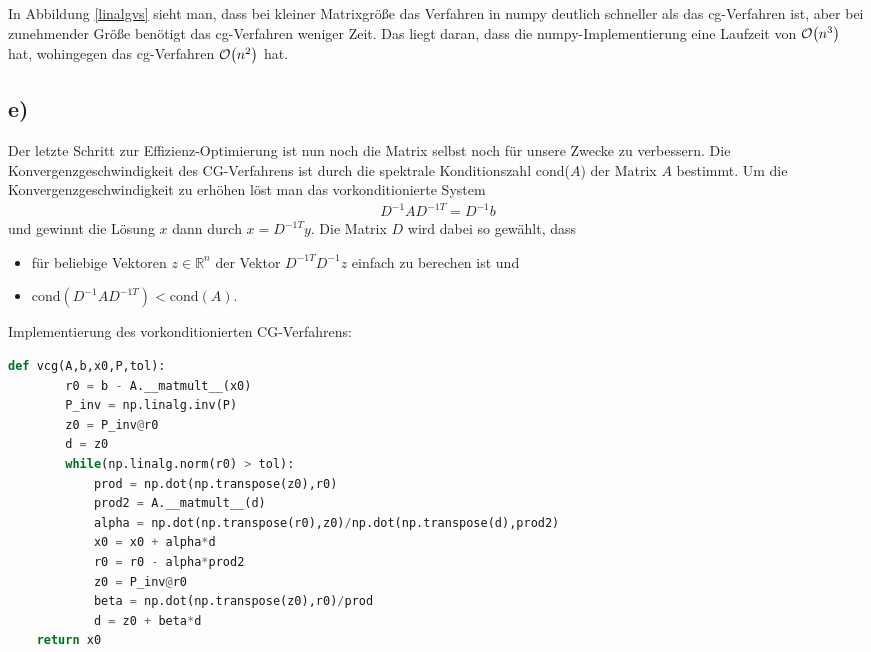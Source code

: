 In Abbildung \ref{linalgvs}  sieht man, dass bei kleiner Matrixgröße das Verfahren in numpy deutlich schneller als das cg-Verfahren ist, aber bei zunehmender Größe benötigt das cg-Verfahren weniger Zeit.
Das liegt daran, dass die numpy-Implementierung eine Laufzeit von $\mathcal{O} {\left ( n^3 \right )}$ hat, wohingegen das cg-Verfahren $\mathcal{O} {\left ( n^2 \right )}$ hat.

\subsection*{e)}
Der letzte Schritt zur Effizienz-Optimierung ist nun noch die Matrix selbst noch für unsere Zwecke zu verbessern.
Die Konvergenzgeschwindigkeit des CG-Verfahrens ist durch die spektrale Konditionszahl cond($A$) der Matrix $A$ bestimmt.
Um die Konvergenzgeschwindigkeit zu erhöhen löst man das vorkonditionierte System
\begin{align*}
  D^{-1}AD^{-1T} = D^{-1}b
\end{align*}
und gewinnt die Lösung $x$ dann durch $x = D^{-1T}y$. Die Matrix $D$ wird dabei so gewählt, dass
\begin{itemize}
\item für beliebige Vektoren $z \in \mathbb{R}^n$ der Vektor $D^{-1T}D^{-1}z$ einfach zu berechen ist und
\item $\text{cond}(D^{-1}AD^{-1T}) < \text{cond}(A)$.
\end{itemize}
Implementierung des vorkonditionierten CG-Verfahrens:
\begin{lstlisting}[language=Python]
    def vcg(A,b,x0,P,tol):
        r0 = b - A.__matmult__(x0)
        P_inv = np.linalg.inv(P)
        z0 = P_inv@r0
        d = z0
        while(np.linalg.norm(r0) > tol):
            prod = np.dot(np.transpose(z0),r0)
            prod2 = A.__matmult__(d)
            alpha = np.dot(np.transpose(r0),z0)/np.dot(np.transpose(d),prod2)
            x0 = x0 + alpha*d
            r0 = r0 - alpha*prod2
            z0 = P_inv@r0
            beta = np.dot(np.transpose(z0),r0)/prod
            d = z0 + beta*d
    return x0
\end{lstlisting}


